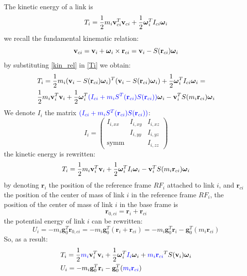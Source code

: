 \documentclass[10pt, a4paper]{report}
\begin{document}
The kinetic energy of a link is\begin{equation}\label{Ti}
     T_i=\frac{1}{2}m_i\mathbf{v}_{ci}^T\mathbf{v}_{ci}+\frac{1}{2}{\boldsymbol{\omega}}_i^TI_{ci}{\boldsymbol{\omega}}_i 
\end{equation}
we recall the fundamental kinematic relation:\begin{equation}\label{kin_rel}
    \mathbf v_{ci}=\mathbf v_i+{\boldsymbol{\omega}}_i\times \mathbf r_{ci}=\mathbf v_i-S(\mathbf r_{ci}){\boldsymbol{\omega}}_i 
\end{equation}
by substituting \eqref{kin_rel} in \eqref{Ti} we obtain:\begin{align}
    &T_i=\frac{1}{2}m_i(\mathbf v_i-S(\mathbf r_{ci}){\boldsymbol{\omega}}_i )^T(\mathbf v_i-S(\mathbf r_{ci}){\boldsymbol{\omega}}_i )+\frac{1}{2}{\boldsymbol{\omega}}_i^TI_{ci}{\boldsymbol{\omega}}_i =\\
    &
    \frac{1}{2}m_i\mathbf v_i^T\mathbf v_i+\frac{1}{2}{\boldsymbol{\omega}}_i^T 
    \color{blue}(I_{ci}+m_iS^T(\mathbf r_{ci})S(\mathbf r_{ci}))\color{black}
    {\boldsymbol{\omega}}_i-\mathbf v_i^T S(m_i\mathbf r_{ci}){\boldsymbol{\omega}}_i
\end{align}
We denote $I_i$ the matrix $\color{blue}(I_{ci}+m_iS^T(\mathbf r_{ci})S(\mathbf r_{ci}))\color{black}$:\begin{equation}
    I_i=\begin{pmatrix}
        I_{i,xx}&I_{i,xy}&I_{i,xz}\\
        &I_{i,yy}&I_{i,yz}\\
        \text{symm}& & I_{i,zz}
    \end{pmatrix}
\end{equation}
the kinetic energy is rewritten:\begin{equation}
    T_i= \frac{1}{2}m_i\mathbf v_i^T\mathbf v_i+\frac{1}{2}{\boldsymbol{\omega}}_i^T 
    I_i
    {\boldsymbol{\omega}}_i-\mathbf v_i^T S(m_i\mathbf r_{ci}){\boldsymbol{\omega}}_i
\end{equation}
by denoting $\mathbf r_i$ the position of the reference frame $RF_i$ attached to link $i$, and $\mathbf r_{ci}$ the position of the center of mass of link $i$ in the reference frame $RF_i$, the position of the center of mass  of link $i$ in the base frame is\begin{equation}
    \mathbf r_{0,ci}=\mathbf r_i+\mathbf r_{ci}
\end{equation}
the potential energy of link $i$ can be rewritten:\begin{equation}
    U_i=-m_i\mathbf g_0^T\mathbf r_{0,ci}=-m_i\mathbf g_0^T(\mathbf r_i+\mathbf r_{ci})=-m_i\mathbf g_0^T\mathbf r_i-\mathbf g_0^T(m_i\mathbf r_{ci})
\end{equation}
So, as a result:\begin{align}
    &T_i= \frac{1}{2}\color{blue}m_i\color{black}\mathbf v_i^T\mathbf v_i+\frac{1}{2}{\boldsymbol{\omega}}_i^T 
    \color{blue}I_i\color{black}
    {\boldsymbol{\omega}}_i+\color{blue}m_i\mathbf r_{ci}\color{black}^TS(\mathbf v_i){\boldsymbol{\omega}}_i
    \\
    &U_i=-m_i\mathbf g_0^T\mathbf r_i-\mathbf g_0^T(\color{blue}m_i\mathbf r_{ci}\color{black})
\end{align}
\end{document}
